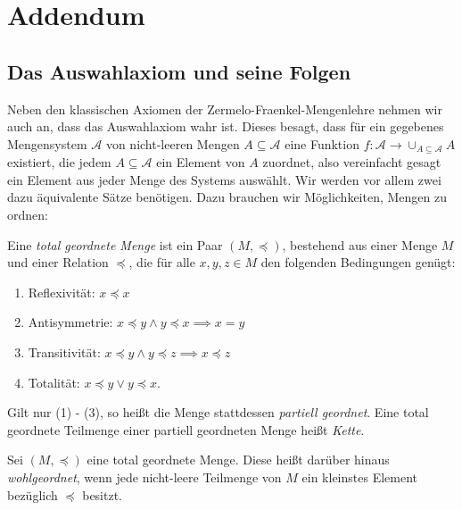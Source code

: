 \documentclass{book}
\begin{document}
\chapter{Addendum}

\section{Das Auswahlaxiom und seine Folgen}%

Neben den klassischen Axiomen der Zermelo-Fraenkel-Mengenlehre nehmen wir auch an, dass das Auswahlaxiom wahr ist. Dieses besagt, dass für ein gegebenes Mengensystem $\mathcal{A}$ von nicht-leeren Mengen $A \subseteq \mathcal{A}$ eine Funktion $f: \mathcal{A} \to \cup_{A \subseteq \mathcal{A}}A$ existiert, die jedem $A \subseteq \mathcal{A}$ ein Element von $A$ zuordnet, also vereinfacht gesagt ein Element aus jeder Menge des Systems auswählt. Wir werden vor allem zwei dazu äquivalente Sätze benötigen. Dazu brauchen wir Möglichkeiten, Mengen zu ordnen:

\begin{defi}
	Eine {\em total geordnete Menge} ist ein Paar $(M, \preceq)$, bestehend aus einer Menge $M$ und einer Relation $\preceq$, die für alle $x,y,z \in M$ den folgenden Bedingungen genügt:
	\begin{enumerate}
	\item Reflexivität: $x \preceq x$
	\item Antisymmetrie: $x \preceq y \land y \preceq x \implies x = y$
	\item Transitivität: $x \preceq y \land y \preceq z \implies x \preceq z$
	\item Totalität: $x \preceq y \lor y \preceq x$.
	\end{enumerate}
	Gilt nur (1) - (3), so heißt die Menge stattdessen {\em partiell geordnet}. Eine total geordnete Teilmenge einer partiell geordneten Menge heißt {\em Kette}.
\end{defi}

\begin{defi}
	Sei $(M, \preceq)$ eine total geordnete Menge. Diese heißt darüber hinaus {\em wohlgeordnet}, wenn jede nicht-leere Teilmenge von $M$ ein kleinstes Element bezüglich $\preceq$ besitzt.
\end{defi}
\end{document}
